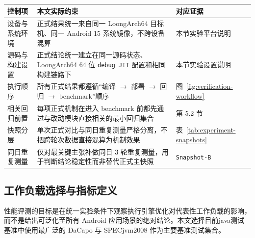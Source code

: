 \begingroup
    \centering
    \begin{minipage}{\textwidth}
        \centering
        \footnotesize
        \setlength{\tabcolsep}{3pt}
        \renewcommand{\arraystretch}{0.92}
        \label{tab:experiment-control-measures}
        \begin{tabular}{>{\raggedright\arraybackslash}p{2.2cm}>{\raggedright\arraybackslash}p{7.0cm}>{\raggedright\arraybackslash}p{3.2cm}}
            \hline
            \textbf{控制项} & \textbf{本文实际约束} & \textbf{对应证据} \\
            \hline
            设备与系统环境 & 正式结果统一来自同一 LoongArch64 目标机、同一 Android 15 系统镜像，不跨设备混算 & 本节实验平台说明 \\
            源码与构建设置 & 正式结论统一建立在同一源码状态、LoongArch64 64 位 \texttt{debug JIT} 配置和相同构建链路下 & 本节实验设置说明 \\
            执行顺序 & 所有正式结果都遵循“编译 $\rightarrow$ 部署 $\rightarrow$ 回归 $\rightarrow$ benchmark”顺序 & 图~\ref{fig:verification-workflow} \\
            相关回归前置 & 每项正式机制在进入 benchmark 前都先通过与改动模块直接相关的最小回归集合 & 第 5.2 节 \\
            快照分层 & 单次正式对比与同日重复测量严格分离，不把跨轮次数据直接混算为机制效果 & 表~\ref{tab:experiment-snapshots} \\
            同日重复测量 & 仅对最关键主张补做同日 3 轮重复测量，用于判断结论稳定性而非替代正式主快照 & \texttt{Snapshot-B} \\
            \hline
        \end{tabular}
    \end{minipage}
    \par
\endgroup

\subsection{工作负载选择与指标定义}

性能评测的目标是在统一实验条件下观察执行引擎优化对代表性工作负载的影响，而不是给出可泛化至所有 Android 应用场景的绝对结论。本文选择目前java测试基准中使用最广泛的 DaCapo 与 SPECjvm2008 作为主要基准测试集合\citep{Blackburn2006,SPECjvm2008}。

